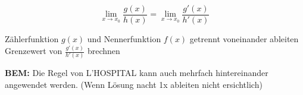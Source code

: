 \begin{multicols*}{3}
    $$ \lim_{x \to x_0} \frac{g(x)}{h(x)} = \lim_{x \to x_0} \frac{g'(x)}{h'(x)}$$

    { Zählerfunktion $g(x)$ und Nennerfunktion $f(x)$ getrennt voneinander ableiten}
    \WhiteSpace
    { Grenzewert von $\frac{g'(x)}{h'(x)}$ brechnen}
    \WhiteSpace

    {\textbf{BEM:} Die Regel von L'HOSPITAL kann auch mehrfach hintereinander angewendet werden.}
    {\small(Wenn Lösung nacht 1x ableiten nicht ersichtlich)}
    \mbox{}

\end{multicols*}



